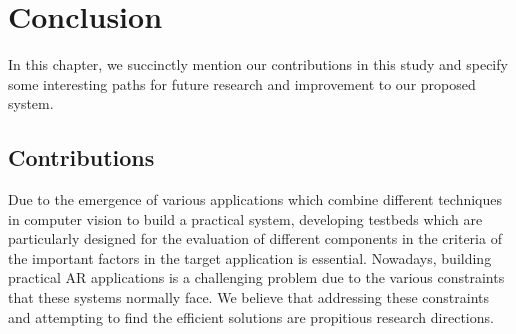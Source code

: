 \chapter{Conclusion}
\label{chap:Conclusion}
In this chapter, we succinctly mention our contributions in this study and specify some interesting paths for future 
research and improvement to our proposed system.

\section{Contributions}
Due to the emergence of various applications which combine different techniques in computer vision 
to build a practical system, developing testbeds which are particularly designed for the evaluation of different components in the criteria of the important factors
in the target application is essential.
Nowadays, building practical AR applications is a challenging problem due to the various constraints that these systems normally face. We believe that
addressing these constraints and attempting to find the efficient solutions are propitious research directions.

